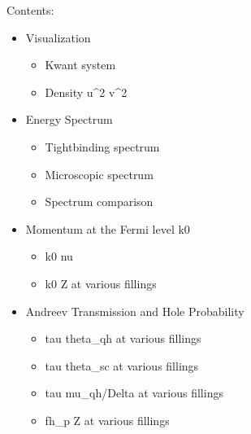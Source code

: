 \documentclass[letterpaper,10pt,english]{sphinxmanual}
\begin{document}
\sphinxAtStartPar
Contents:
\begin{itemize}
\item {} 
\sphinxAtStartPar
Visualization
\begin{itemize}
\item {} 
\sphinxAtStartPar
Kwant system

\item {} 
\sphinxAtStartPar
Density u\textasciicircum{}2 \sphinxhyphen{} v\textasciicircum{}2

\end{itemize}

\item {} 
\sphinxAtStartPar
Energy Spectrum
\begin{itemize}
\item {} 
\sphinxAtStartPar
Tight\sphinxhyphen{}binding spectrum

\item {} 
\sphinxAtStartPar
Microscopic spectrum

\item {} 
\sphinxAtStartPar
Spectrum comparison

\end{itemize}

\item {} 
\sphinxAtStartPar
Momentum at the Fermi level k0
\begin{itemize}
\item {} 
\sphinxAtStartPar
k0  nu

\item {} 
\sphinxAtStartPar
k0  Z at various fillings

\end{itemize}

\item {} 
\sphinxAtStartPar
Andreev Transmission and Hole Probability
\begin{itemize}
\item {} 
\sphinxAtStartPar
tau  theta\_qh at various fillings

\item {} 
\sphinxAtStartPar
tau  theta\_sc at various fillings

\item {} 
\sphinxAtStartPar
tau  mu\_qh/Delta at various fillings

\item {} 
\sphinxAtStartPar
fh\_p  Z at various fillings


\end{itemize}
\end{itemize}
\end{document}
